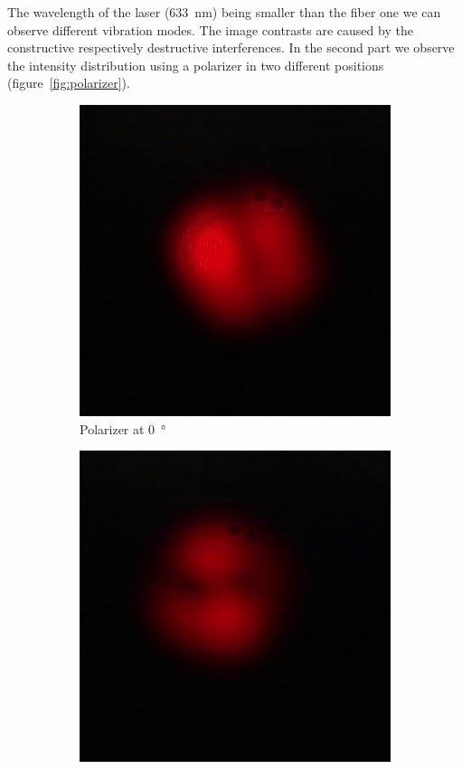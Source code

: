 \documentclass[a4paper, 12pt]{paper}
\begin{document}
The wavelength of the laser (\SI{633}{\nano\meter}) being smaller than the fiber one we can observe different vibration modes.
The image contrasts are caused by the constructive respectively destructive interferences. 
In the second part we observe the intensity distribution using a polarizer in two different positions (figure~\ref{fig:polarizer}).

\begin{figure}[H]
    \centering
    \begin{subfigure}[t]{0.3\textwidth}
        \includegraphics[width=\textwidth]{img/polarizer_0}
        \caption{Polarizer at \SI{0}{\degree}}
    \end{subfigure}
    \begin{subfigure}[t]{0.3\textwidth}
        \includegraphics[width=\textwidth]{img/polarizer_90}

\end{subfigure}
\end{figure}
\end{document}
